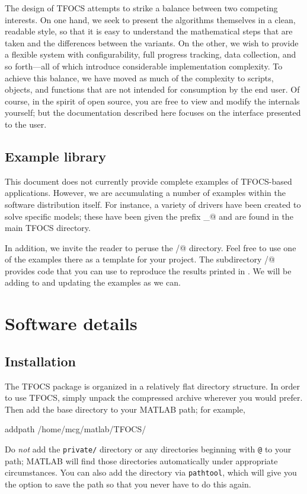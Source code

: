 \documentclass{article}
\newcommand{\<}{\langle}
\renewcommand{\>}{\rangle}
\begin{document}
The design of TFOCS attempts to strike a balance
between two competing interests. On one hand, we seek to present
the algorithms themselves in a clean, readable
style, so that it is easy to understand the mathematical steps
that are taken and the differences between the variants. On
the other, we wish to provide a flexible system with 
configurability, full progress tracking, data collection, and
so forth---all of which introduce considerable implementation
complexity. To achieve this balance, we have moved as much of the
complexity to scripts, objects, and functions that are not intended for
consumption by the end user. Of course, in the spirit of open
source, you are free to view and modify the internals yourself;
but the documentation described here focuses on the interface
presented to the user.

\subsection{Example library}

This document does not currently provide complete examples
of TFOCS-based applications. However, we are accumulating a number of examples
within the software distribution itself. For instance,
a variety of drivers have been created to solve specific models;
these have been given the prefix \verb@solver_@ and are found in
the main TFOCS directory. 

In addition, we invite the reader
to peruse the \verb@examples/@ directory.
Feel free to use one of the examples there as
a template for your project. The subdirectory \verb@paper/@
provides code that you can use to reproduce the results printed in \cite{TFOCS}.
We will be adding to and updating the examples as we can.

\section{Software details}
\label{sec:software}

\subsection{Installation}

The TFOCS package is organized in a relatively flat directory
structure. In order to use TFOCS, simply unpack the compressed 
archive wherever you would prefer. Then add the base directory to your
MATLAB path; for example,
\begin{code}
	addpath /home/mcg/matlab/TFOCS/
\end{code}
Do \emph{not} add the \verb+private/+ directory or any directories beginning
with \verb+@+ to your path; MATLAB will find those directories automatically
under appropriate circumstances.
You can also add the directory via \verb+pathtool+, which will give you the option
to save the path so that you never have to do this again.
\end{document}
